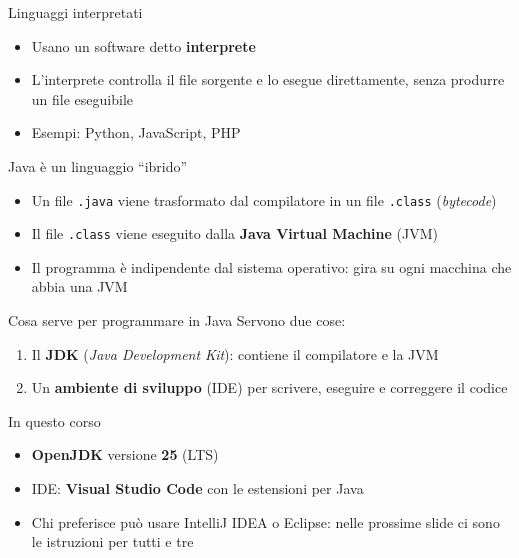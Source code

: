 \documentclass[aspectratio=169,10pt,t]{beamer}
\begin{document}
\begin{frame}{Linguaggi interpretati}
  \begin{itemize}
    \item Usano un software detto \textbf{interprete}
    \item L'interprete controlla il file sorgente e lo esegue direttamente, senza produrre un file eseguibile
    \item Esempi: Python, JavaScript, PHP
  \end{itemize}
  \vspace{1.5em}
  \begin{center}
    \freccia{}\freccia{}
  \end{center}
\end{frame}

\begin{frame}{Java \`e un linguaggio ``ibrido''}
  \begin{itemize}
    \item Un file \texttt{.java} viene trasformato dal compilatore in un file \texttt{.class} (\emph{bytecode})
    \item Il file \texttt{.class} viene eseguito dalla \textbf{Java Virtual Machine} (JVM)
    \item Il programma \`e indipendente dal sistema operativo: gira su ogni macchina che abbia una JVM
  \end{itemize}
  \vspace{1.5em}
  \begin{center}\small
    \freccia{}\freccia{}\freccia{}\freccia{}
  \end{center}
\end{frame}

\begin{frame}{Cosa serve per programmare in Java}
  Servono due cose:
  \begin{enumerate}
    \item Il \textbf{JDK} (\emph{Java Development Kit}): contiene il compilatore e la JVM
    \item Un \textbf{ambiente di sviluppo} (IDE) per scrivere, eseguire e correggere il codice
  \end{enumerate}
  \vspace{0.8em}
  \begin{block}{In questo corso}
    \begin{itemize}
      \item \textbf{OpenJDK} versione \textbf{25} (LTS)
      \item IDE: \textbf{Visual Studio Code} con le estensioni per Java
      \item Chi preferisce pu\`o usare IntelliJ IDEA o Eclipse: nelle prossime slide ci sono le istruzioni per tutti e tre
    \end{itemize}
  \end{block}
\end{frame}
\end{document}
